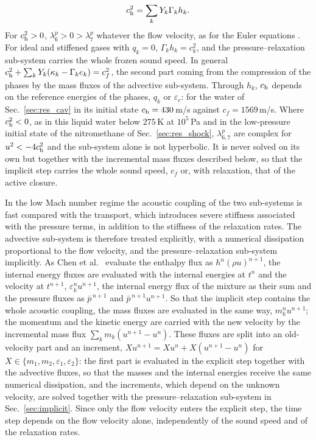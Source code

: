 \begin{enumerate}
\begin{equation}
\begin{gathered}
c_{\rm h}^2=\sum_kY_k\Gamma_kh_k .
\end{gathered}
\label{eq:eig_p}
\end{equation}
For $c_{\rm h}^2>0$, $\lambda^p_6>0>\lambda^p_7$ whatever the flow velocity, as for the Euler equations \cite{ToroVazquez2012}. For ideal and
stiffened gases with $q_k=0$, $\Gamma_kh_k=c_k^2$, and the pressure--relaxation sub-system carries the whole frozen sound speed. In
general $c_{\rm h}^2+\sum_kY_k(\kappa_k-\Gamma_ke_k)=c_f^2$, the second part coming from the compression of the phases by the mass fluxes
of the advective sub-system. Through $h_k$, $c_{\rm h}$ depends on the reference energies of the phases, $q_k$ or $\varepsilon_r$: for the water of
Sec.~\ref{sec:res_cav} in its initial state $c_{\rm h}=430$\,m/s against $c_f=1569$\,m/s. Where $c_{\rm h}^2<0$, as in this liquid water below $275$\,K
at $10^5$\,Pa and in the low-pressure initial state of the nitromethane of Sec.~\ref{sec:res_shock}, $\lambda^p_{6,7}$ are complex for $u^2<-4c_{\rm h}^2$
and the sub-system alone is not hyperbolic. It is never solved on its own but together with the incremental mass fluxes
described below, so that the implicit step carries the whole sound speed, $c_f$ or, with relaxation, that of the active
closure.
\end{enumerate}
In the low Mach number regime the acoustic coupling of the two sub-systems is fast compared with the transport, which
introduces severe stiffness associated with the pressure terms, in addition to the stiffness of the relaxation rates.
The advective sub-system is therefore treated explicitly, with a numerical dissipation proportional to the flow velocity,
and the pressure--relaxation sub-system implicitly. As Chen et al.\ \cite{Chen2026} evaluate the enthalpy flux as $h^n(\rho u)^{n+1}$,
the internal energy fluxes are evaluated with the internal energies at $t^n$ and the velocity at $t^{n+1}$, $\varepsilon^n_ku^{n+1}$, the internal
energy flux of the mixture as their sum and the pressure fluxes as $\bar p^{\,n+1}$ and $\bar p^{\,n+1}u^{n+1}$. So that the implicit step contains the whole
acoustic coupling, the mass fluxes are evaluated in the same way, $m^n_ku^{n+1}$; the momentum and the kinetic energy are carried
with the new velocity by the incremental mass flux $\sum_km_k(u^{n+1}-u^n)$. These fluxes are split into an old-velocity part and an
increment, $Xu^{n+1}=Xu^n+X(u^{n+1}-u^n)$ for $X\in\{m_1,m_2,\varepsilon_1,\varepsilon_2\}$: the first part is evaluated in the explicit step together with the advective fluxes, so that the masses and the internal energies receive the same
numerical dissipation, and the increments, which depend on the unknown velocity, are solved together with the
pressure--relaxation sub-system in Sec.~\ref{sec:implicit}. Since only the flow velocity enters the explicit step, the time step depends
on the flow velocity alone, independently of the sound speed and of the relaxation rates.
